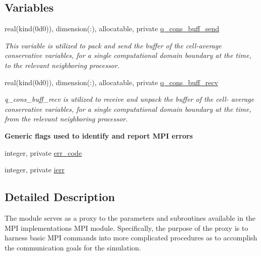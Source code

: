 \subsection*{Variables}
\begin{DoxyCompactItemize}
\item 
real(kind(0d0)), dimension(\+:), allocatable, private \hyperlink{namespacem__mpi__proxy_a67f9b5b69858f72c61b8d8ebf212567d}{q\+\_\+cons\+\_\+buff\+\_\+send}
\begin{DoxyCompactList}\small\item\em This variable is utilized to pack and send the buffer of the cell-\/average conservative variables, for a single computational domain boundary at the time, to the relevant neighboring processor. \end{DoxyCompactList}\item 
real(kind(0d0)), dimension(\+:), allocatable, private \hyperlink{namespacem__mpi__proxy_a2915932883654eecbac1283ce03be3ba}{q\+\_\+cons\+\_\+buff\+\_\+recv}
\begin{DoxyCompactList}\small\item\em q\+\_\+cons\+\_\+buff\+\_\+recv is utilized to receive and unpack the buffer of the cell-\/ average conservative variables, for a single computational domain boundary at the time, from the relevant neighboring processor. \end{DoxyCompactList}\end{DoxyCompactItemize}
\begin{Indent}\textbf{ Generic flags used to identify and report M\+PI errors}\par
\begin{DoxyCompactItemize}
\item 
integer, private \hyperlink{namespacem__mpi__proxy_ae5709407e3600d19d79b183e409bb982}{err\+\_\+code}
\item 
integer, private \hyperlink{namespacem__mpi__proxy_a306ba163b09cfc692125f2c0ba82ef8c}{ierr}
\end{DoxyCompactItemize}
\end{Indent}


\subsection{Detailed Description}
The module serves as a proxy to the parameters and subroutines available in the M\+PI implementation\textquotesingle{}s M\+PI module. Specifically, the purpose of the proxy is to harness basic M\+PI commands into more complicated procedures as to accomplish the communication goals for the simulation. 

